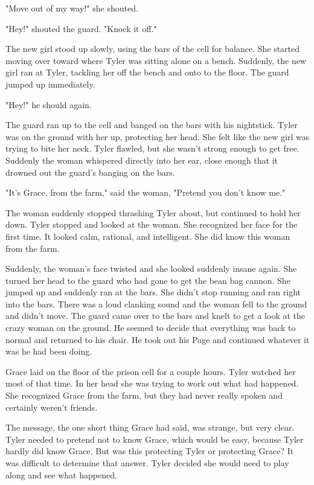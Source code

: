 \documentclass[courier]{sffms}
\begin{document}
"Move out of my way!" she shouted.

"Hey!" shouted the guard. "Knock it off."

The new girl stood up slowly, using the bars of the cell
for balance. She started moving over toward where
Tyler was sitting alone on a bench. Suddenly, the new
girl ran at Tyler, tackling her off the bench and onto
to the floor. The guard jumped up immediately.

"Hey!" he should again.

The guard ran up to the cell and banged on the bars
with his nightstick. Tyler was on the ground with her
up, protecting her head. She felt like the new girl was
trying to bite her neck. Tyler flawled, but she wasn't
strong enough to get free. Suddenly the woman whispered
directly into her ear, close enough that it drowned
out the guard's banging on the bars.

"It's Grace, from the farm," said the woman, "Pretend
you don't know me."

The woman suddenly stopped thrashing Tyler about, but
continued to hold her down. Tyler stopped and looked
at the woman. She recognized her face for the first time.
It looked calm, rational, and intelligent. She did know this
woman from the farm.

Suddenly, the woman's face twisted and she looked
suddenly insane again. She turned her head to the guard
who had gone to get the bean bag cannon. She jumped up
and suddenly ran at the bars. She didn't stop running
and ran right into the bars. There was a loud clanking
sound and the woman fell to the ground and didn't move.
The guard came over to the bars and knelt to get a
look at the crazy woman on the ground. He seemed
to decide that everything was back to normal and returned
to his chair. He took out his Page and continued whatever
it was he had been doing.

Grace laid on the floor of the prison cell for a couple
hours. Tyler watched her most of that time. In her head
she was trying to work out what had happened. She
recognized Grace from the farm, but they had never
really spoken and certainly weren't friends.

The message, the one short thing Grace had said, was
strange, but very clear. Tyler needed to pretend not to
know Grace, which would be easy, because Tyler
hardly did know Grace. But was this protecting Tyler
or protecting Grace? It was difficult to determine that
answer. Tyler decided she would need to play along and
see what happened.
\end{document}
